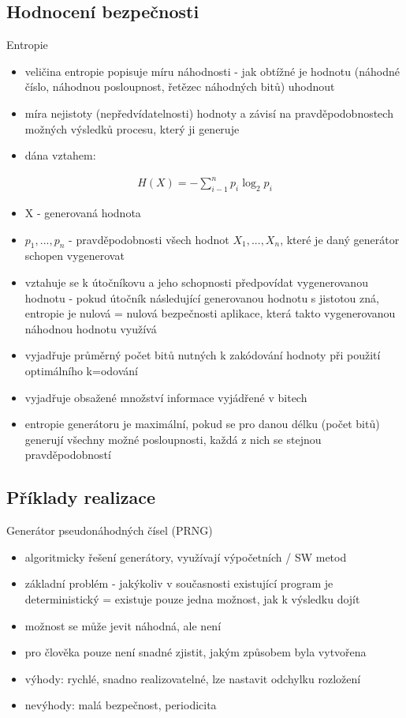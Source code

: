 \subsection{Hodnocení bezpečnosti}
Entropie
\begin{itemize}
    \item veličina entropie popisuje míru náhodnosti - jak obtížné je hodnotu (náhodné číslo, náhodnou posloupnost, řetězec náhodných bitů) uhodnout
    \item míra nejistoty (nepředvídatelnosti) hodnoty a závisí na pravděpodobnostech možných výsledků procesu, který ji generuje
    \item dána vztahem:
\end{itemize}
\begin{align*}
    H(X) = - \displaystyle\sum\limits_{i-1}^n p_{i} \log_2 p_{i} 
\end{align*}
\begin{itemize}
    \item X - generovaná hodnota
    \item $p_{1},..., p_{n}$ - pravděpodobnosti všech hodnot $X_{1},..., X_{n}$, které je daný generátor schopen vygenerovat
    \item vztahuje se k útočníkovu a jeho schopnosti předpovídat vygenerovanou hodnotu - pokud útočník následující generovanou hodnotu s jistotou zná, entropie je nulová = nulová bezpečnosti aplikace, která takto vygenerovanou náhodnou hodnotu využívá
    \item vyjadřuje průměrný počet bitů nutných k zakódování hodnoty při použití optimálního k=odování
    \item vyjadřuje obsažené množství informace vyjádřené v bitech
    \item entropie generátoru je maximální, pokud se pro danou délku (počet bitů) generují všechny možné posloupnosti, každá z nich se stejnou pravděpodobností
\end{itemize}

\subsection{Příklady realizace}
Generátor pseudonáhodných čísel (PRNG)
\begin{itemize}
    \item algoritmicky řešení generátory, využívají výpočetních / SW metod
    \item základní problém - jakýkoliv v současnosti existující program je deterministický = existuje pouze jedna možnost, jak k výsledku dojít
    \item možnost se může jevit náhodná, ale není
    \item pro člověka pouze není snadné zjistit, jakým způsobem byla vytvořena
    \item výhody: rychlé, snadno realizovatelné, lze nastavit odchylku rozložení
    \item nevýhody: malá bezpečnost, periodicita \\
\end{itemize}


